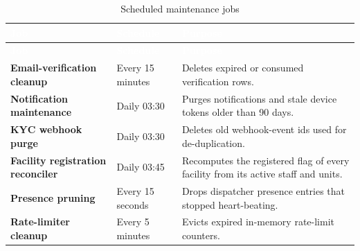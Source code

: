 {\tabfont\rowband
\begin{longtable}{@{}>{\raggedright\arraybackslash}p{}>{\raggedright\arraybackslash}p{}>{\raggedright\arraybackslash}p{}@{}}
\caption{Scheduled maintenance jobs}\label{tab:jobs}\\
\rowcolor{najdanavy}\textcolor{white}{\sffamily\bfseries\small Job} & \textcolor{white}{\sffamily\bfseries\small Schedule} & \textcolor{white}{\sffamily\bfseries\small Purpose}\\
\endfirsthead
\rowcolor{najdanavy}\textcolor{white}{\sffamily\bfseries\small Job} & \textcolor{white}{\sffamily\bfseries\small Schedule} & \textcolor{white}{\sffamily\bfseries\small Purpose}\\
\endhead
\bottomrule\endlastfoot
\textbf{Email-verification cleanup} & Every 15 minutes & Deletes expired or consumed verification rows.\\
\textbf{Notification maintenance} & Daily 03:30 & Purges notifications and stale device tokens older than 90 days.\\
\textbf{KYC webhook purge} & Daily 03:30 & Deletes old webhook-event ids used for de-duplication.\\
\textbf{Facility registration reconciler} & Daily 03:45 & Recomputes the registered flag of every facility from its active staff and units.\\
\textbf{Presence pruning} & Every 15 seconds & Drops dispatcher presence entries that stopped heart-beating.\\
\textbf{Rate-limiter cleanup} & Every 5 minutes & Evicts expired in-memory rate-limit counters.\\
\end{longtable}}

